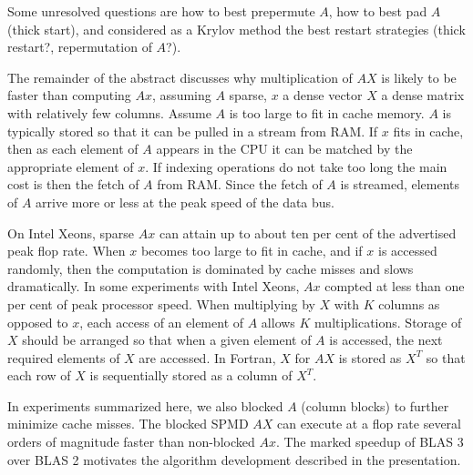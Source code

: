 \documentclass{report}
\begin{document}
Some unresolved questions are how to best prepermute $A$, how to best pad
$A$ (thick start), and considered as a Krylov method the best restart
strategies (thick restart?, repermutation of $A$?).

The remainder of the abstract discusses why multiplication of $AX$ is
likely to be faster than computing $Ax$, assuming $A$ sparse, $x$ a dense
vector $X$ a dense matrix with relatively few columns. Assume $A$ is too
large to fit in cache memory. $A$ is typically stored so that it can be
pulled in a stream from RAM.
If $x$ fits in cache, then as each element of $A$ appears in the CPU it
can be matched by the appropriate element of $x$. If indexing operations
do not take too long the main cost is then the fetch of $A$ from RAM.
Since the fetch of $A$ is streamed, elements of $A$ arrive more or less
at the peak speed of the data bus.

On Intel Xeons, sparse $Ax$ can attain up to about ten per cent of the
advertised peak flop rate. When $x$ becomes too large to fit in cache,
and if $x$ is accessed randomly, then the
computation is dominated by cache misses and slows dramatically. In some
experiments with Intel Xeons, $Ax$ compted at less than one per cent of
peak processor speed. When multiplying by $X$ with $K$ columns as opposed
to $x$, each access of an element of $A$ allows $K$ multiplications.
Storage of $X$ should be arranged so that when a given element of $A$ is
accessed, the next required elements of $X$ are accessed. In Fortran, $X$
for $AX$ is stored as $X^T$ so that each row of $X$ is sequentially
stored as a column of $X^T$.

In experiments summarized here, we also blocked $A$ (column blocks) to
further minimize cache misses. The blocked SPMD $AX$ can execute at a
flop rate several orders of magnitude faster than non-blocked $Ax$. The
marked speedup of BLAS 3 over BLAS 2 motivates the algorithm development
described in the presentation.
\end{document}
